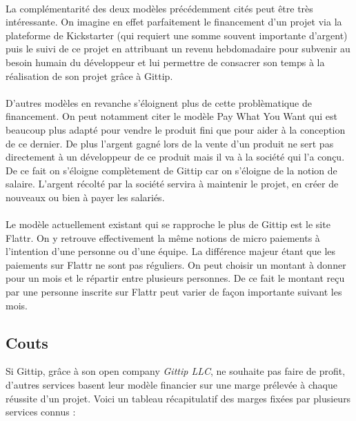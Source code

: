 \paragraph{}
La complémentarité des deux modèles précédemment cités peut être très
intéressante. On
imagine en effet parfaitement le financement d'un projet via la plateforme de
Kickstarter (qui requiert une somme souvent importante d'argent) puis le suivi
de ce projet en attribuant un revenu hebdomadaire pour subvenir au besoin
humain du développeur et lui permettre de consacrer son temps à la réalisation
de son projet grâce à Gittip.

\paragraph{}
D'autres modèles en revanche s'éloignent plus de cette problèmatique de
financement. On peut notamment citer le modèle Pay What You Want qui est
beaucoup plus adapté pour vendre le produit fini que pour aider à la conception
de ce dernier. De plus l'argent gagné lors de la vente d'un produit ne sert pas
directement à un développeur de ce produit mais il va à la société qui l'a
conçu. De ce fait on s'éloigne complètement de Gittip car on s'éloigne de la
notion de salaire. L'argent récolté par la société servira à maintenir le
projet, en créer de nouveaux ou bien à payer les salariés.

\paragraph{}
Le modèle actuellement existant qui se rapproche le plus de Gittip est le site
Flattr. On y retrouve effectivement la même notions de micro paiements à
l'intention d'une personne ou d'une équipe. La différence majeur étant que les
paiements sur Flattr ne sont pas réguliers. On peut choisir un montant à donner
pour un mois et le répartir entre plusieurs personnes. De ce fait le montant
reçu par une personne inscrite sur Flattr peut varier de façon importante
suivant les mois.
\subsection{Couts}

Si Gittip, grâce à son open company \emph{Gittip LLC}, ne souhaite pas faire de
profit, d'autres services basent leur modèle financier sur une marge prélevée à
chaque réussite d'un projet. Voici un tableau récapitulatif des marges fixées
par plusieurs services connus :

